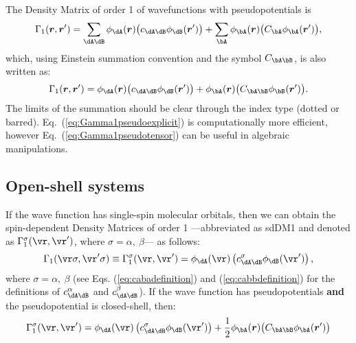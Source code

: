 The Density Matrix of order 1 of wavefunctions with pseudopotentials is
%
\begin{equation}\label{eq:Gamma1pseudoexplicit}
  \Gamma_1(\boldsymbol{r},\boldsymbol{r}')=\sum_{\dA\dB}
  \phi_{\dA}(\boldsymbol{r})\big(c_{\dA\dB}\phi_{\dB}(\boldsymbol{r}')\big)
  +\sum_{\bA}
  \phi_{\bA}(\boldsymbol{r})\big(C_{\bA}\phi_{\bA}(\boldsymbol{r}')\big),
\end{equation}
%
which, using Einstein summation convention and the symbol $C_{\bA\bB}$, is also written as:
%
\begin{equation}\label{eq:Gamma1pseudotensor}
  \Gamma_1(\boldsymbol{r},\boldsymbol{r}')=
  \phi_{\dA}(\boldsymbol{r})\big(c_{\dA\dB}\phi_{\dB}(\boldsymbol{r}')\big)
  +\phi_{\bA}(\boldsymbol{r})\big(C_{\bA\bB}\phi_{\bB}(\boldsymbol{r}')\big).
\end{equation}
%
The limits of the summation should be clear through the index type (dotted or barred).
Eq.~(\ref{eq:Gamma1pseudoexplicit}) is computationally more efficient, however
Eq.~(\ref{eq:Gamma1pseudotensor}) can be useful in algebraic manipulations.


\subsection{Open-shell systems}
If the wave function has single-spin molecular orbitals, then we can obtain the spin-dependent
Density Matrices of order 1 ---abbreviated as sdDM1 and denoted as
$\Gamma^{\sigma}_1(\vr,\vr')$, where $\sigma=\alpha,\ \beta$--- as follows:
%
\begin{equation}
	\Gamma_1(\vr\sigma,\vr'\sigma)\equiv\Gamma^{\sigma}_1(\vr,\vr')=
	\phi_{\dA}(\vr)\left(c_{\dA\dB}^{\sigma}\phi_{\dB}(\vr')\right),
\end{equation}
%
where $\sigma=\alpha,\ \beta$ (see Eqs. (\ref{eq:cabadefinition}) and
(\ref{eq:cabbdefinition}) for the definitions of $c_{\dA\dB}^{\alpha}$ and
$c_{\dA\dB}^{\beta}$).
If the wave function has pseudopotentials \textbf{and} the pseudopotential is closed-shell, then:
%
\begin{equation}
	\Gamma^{\sigma}_1(\vr,\vr')=
	\phi_{\dA}(\vr)\left(c_{\dA\dB}^{\sigma}\phi_{\dB}(\vr')\right)
	+\frac{1}{2}\phi_{\bA}(\boldsymbol{r})\big(C_{\bA\bB}\phi_{\bA}(\boldsymbol{r}')\big)
\end{equation}
%

